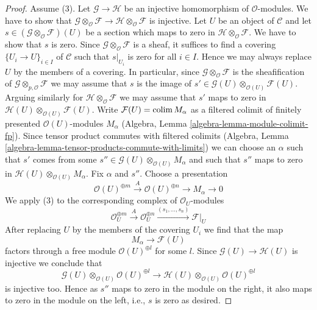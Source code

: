 \begin{proof}
\medskip\noindent
Assume (3). Let $\mathcal{G} \to \mathcal{H}$ be an injective homomorphism
of $\mathcal{O}$-modules. We have to show that
$\mathcal{G} \otimes_\mathcal{O} \mathcal{F} \to
\mathcal{H} \otimes_\mathcal{O} \mathcal{F}$
is injective. Let $U$ be an object of $\mathcal{C}$
and let $s \in (\mathcal{G} \otimes_\mathcal{O} \mathcal{F})(U)$
be a section which maps to zero in
$\mathcal{H} \otimes_\mathcal{O} \mathcal{F}$.
We have to show that $s$ is zero. Since
$\mathcal{G} \otimes_\mathcal{O} \mathcal{F}$
is a sheaf, it suffices to find a covering $\{U_i \to U\}_{i \in I}$
of $\mathcal{C}$ such that $s|_{U_i}$ is zero for all $i \in I$.
Hence we may always replace $U$ by the members of a covering.
In particular, since $\mathcal{G} \otimes_\mathcal{O} \mathcal{F}$
is the sheafification of $\mathcal{G} \otimes_{p, \mathcal{O}} \mathcal{F}$
we may assume that $s$ is the image of $s' \in 
\mathcal{G}(U) \otimes_{\mathcal{O}(U)} \mathcal{F}(U)$.
Arguing similarly for $\mathcal{H} \otimes_\mathcal{O} \mathcal{F}$
we may assume that $s'$ maps to zero in
$\mathcal{H}(U) \otimes_{\mathcal{O}(U)} \mathcal{F}(U)$.
Write $\mathcal{F}(U) = \mathop{\mathrm{colim}}\nolimits M_\alpha$ as a filtered colimit of finitely
presented $\mathcal{O}(U)$-modules $M_\alpha$
(Algebra, Lemma \ref{algebra-lemma-module-colimit-fp}).
Since tensor product commutes with filtered colimits
(Algebra, Lemma \ref{algebra-lemma-tensor-products-commute-with-limits})
we can choose an $\alpha$ such that $s'$
comes from some $s'' \in \mathcal{G}(U) \otimes_{\mathcal{O}(U)} M_\alpha$
and such that $s''$ maps to zero in
$\mathcal{H}(U) \otimes_{\mathcal{O}(U)} M_\alpha$.
Fix $\alpha$ and $s''$.
Choose a presentation
$$
\mathcal{O}(U)^{\oplus m} \xrightarrow{A} \mathcal{O}(U)^{\oplus n}
\to M_\alpha \to 0
$$
We apply (3) to the corresponding complex of $\mathcal{O}_U$-modules
$$
\mathcal{O}_U^{\oplus m} \xrightarrow{A}
\mathcal{O}_U^{\oplus n} \xrightarrow{(s_1, \ldots, s_n)}
\mathcal{F}|_U
$$
After replacing $U$ by the members of the covering $U_i$
we find that the map
$$
M_\alpha \to \mathcal{F}(U)
$$
factors through a free module $\mathcal{O}(U)^{\oplus l}$ for some $l$.
Since $\mathcal{G}(U) \to \mathcal{H}(U)$ is injective
we conclude that
$$
\mathcal{G}(U) \otimes_{\mathcal{O}(U)} \mathcal{O}(U)^{\oplus l}
\to
\mathcal{H}(U) \otimes_{\mathcal{O}(U)} \mathcal{O}(U)^{\oplus l}
$$
is injective too. Hence as $s''$ maps to zero in the module on
the right, it also maps to zero in the module on the left, i.e.,
$s$ is zero as desired.
\end{proof}

